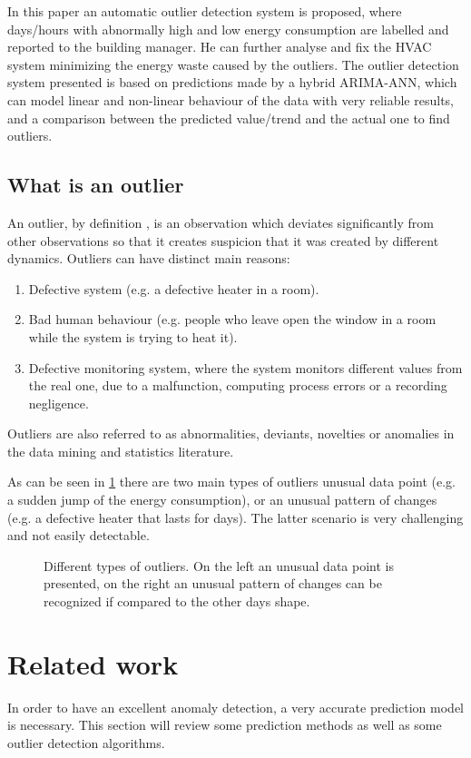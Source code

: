 \documentclass{sig-alternate-sigmod07}
\begin{document}
In this paper an automatic outlier detection system is proposed, where days/hours with abnormally high and low energy consumption are labelled and reported to the building manager. He can further analyse and fix the HVAC system minimizing the energy waste caused by the outliers. The outlier detection system presented is based on predictions made by a hybrid ARIMA-ANN, which can model linear and non-linear behaviour of the data with very reliable results, and a comparison between the predicted value/trend and the actual one to find outliers. 

\subsection{What is an outlier}
An outlier, by definition \cite{hawkins1980identification}, is an observation which deviates significantly from other observations so that it creates suspicion that it was created by different dynamics. Outliers can have distinct main reasons: 
\begin{enumerate}
  \item Defective system (e.g. a defective heater in a room).
  \item Bad human behaviour (e.g. people who leave open the window in a room while the system is trying to heat it).
  \item Defective monitoring system, where the system monitors different values from the real one, due to a malfunction, computing process errors or a recording negligence. 
\end{enumerate}

Outliers are also referred to as abnormalities, deviants, novelties or anomalies in the data mining and statistics literature.

As can be seen in \cref{fig:outlierTypes} there are two main types of outliers unusual data point (e.g. a sudden jump of the energy consumption), or an unusual pattern of changes (e.g. a defective heater that lasts for days). The latter scenario is very challenging and not easily detectable.

\begin{figure}[h!]
\centering
{}
\caption{Different types of outliers. On the left an unusual data point is presented, on the right an unusual pattern of changes can be recognized if compared to the other days shape.}
\label{fig:outlierTypes}
\end{figure}

\section{Related work}
In order to have an excellent anomaly detection, a very accurate prediction model is necessary. This section will review some prediction methods as well as some outlier detection algorithms.
\end{document}
